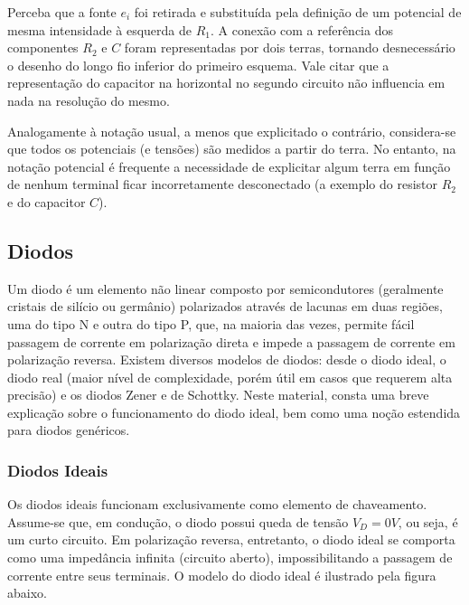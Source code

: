 \documentclass{article}
\numberwithin{equation}{section}
\begin{document}
Perceba que a fonte $e_i$ foi retirada e substituída pela definição de um potencial de mesma intensidade à esquerda de $R_1$. A conexão com a referência dos componentes $R_2$ e $C$ foram representadas por dois terras, tornando desnecessário o desenho do longo fio inferior do primeiro esquema. Vale citar que a representação do capacitor na horizontal no segundo circuito não influencia em nada na resolução do mesmo.

Analogamente à notação usual, a menos que explicitado o contrário, considera-se que todos os potenciais (e tensões) são medidos a partir do terra. No entanto, na notação potencial é frequente a necessidade de explicitar algum terra em função de nenhum terminal ficar incorretamente desconectado (a exemplo do resistor $R_2$ e do capacitor $C$).

\subsection{Diodos}
\label{subsec:diodos}
Um diodo é um elemento não linear composto por semicondutores (geralmente cristais de silício ou germânio) polarizados através de lacunas em duas regiões, uma do tipo N e outra do tipo P, que, na maioria das vezes, permite fácil passagem de corrente em polarização direta e impede a passagem de corrente em polarização reversa. Existem diversos modelos de diodos: desde o diodo ideal, o diodo real (maior nível de complexidade, porém útil em casos que requerem alta precisão) e os diodos Zener e de Schottky. Neste material, consta uma breve explicação sobre o funcionamento do diodo ideal, bem como uma noção estendida para diodos genéricos.

\subsubsection{Diodos Ideais}
\label{subsubsec:diodos}
Os diodos ideais funcionam exclusivamente como elemento de chaveamento. Assume-se que, em condução, o diodo possui queda de tensão $V_{D}=0V$, ou seja, é um curto circuito. Em polarização reversa, entretanto, o diodo ideal se comporta como uma impedância infinita (circuito aberto), impossibilitando a passagem de corrente entre seus terminais. O modelo do diodo ideal é ilustrado pela figura abaixo.
\begin{center}
\end{center}
\end{document}
